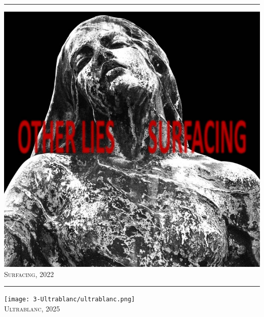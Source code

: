 \begin{titlepage}
  \vspace{1em}
  \noindent\rule{0.7\textwidth}{0.5pt}
  \vspace{0.5em}

  \begin{minipage}[t]{0.25\textheight}
    \centering
    \includegraphics[height=0.25\textheight]{2-Surfacing/surfacing.jpg}\\
    \vspace{1em}
    {\Large \scshape Surfacing, 2022}
  \end{minipage}

  \vspace{1em}
  \noindent\rule{0.7\textwidth}{0.5pt}
  \vspace{0.5em}

  \begin{minipage}[t]{0.25\textheight}
    \centering
    \texttt{[image: 3-Ultrablanc/ultrablanc.png]}\\
    \vspace{1em}
    {\Large \scshape Ultrablanc, 2025}
  \end{minipage}%

\end{titlepage}

\pagecolor{white}
\color{black}
